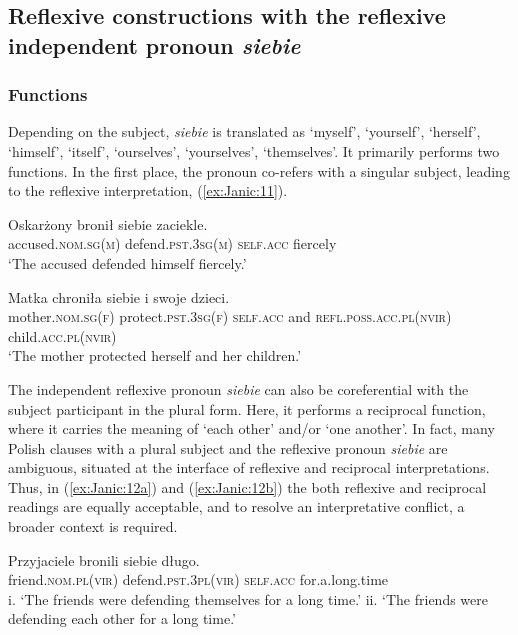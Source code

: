 \documentclass[output=paper]{langscibook}
\begin{document}
\subsection{Reflexive constructions with the reflexive independent pronoun \textit{siebie}} \label{sec:Janic:3.1}
\subsubsection{Functions} \label{sec:Janic:3.1.1}

Depending on the subject, \textit{siebie} is translated as ‘myself’, ‘yourself’, ‘herself’, ‘himself’, ‘itself’, ‘ourselves’, ‘yourselves’, ‘themselves’. It primarily performs two functions. In the first place, the pronoun co-refers with a singular subject, leading to the reflexive interpretation, (\ref{ex:Janic:11}).

\ea \label{ex:Janic:11}
\ea \label{ex:Janic:11a}
\gll Oskarżony	 	bronił			 siebie		 zaciekle.\\
		accused.\textsc{nom.sg(m)}	defend.\textsc{pst.3sg(m)}	\textsc{self.acc}	fiercely \\
\glt ‘The accused defended himself fiercely.’
	
\ex \label{ex:Janic:11b}
\gll Matka	 chroniła	 siebie 	 i 	swoje			 dzieci.\\
		mother.\textsc{nom.sg(f)}	protect.\textsc{pst.3sg(f)}	\textsc{self.acc}	and	\textsc{refl.poss.acc.pl(nvir)}	child.\textsc{acc.pl(nvir)} \\
\glt	‘The mother protected herself and her children.’
\z 
\z
	
	
The independent reflexive pronoun \textit{siebie} can also be coreferential with the subject participant in the plural form. Here, it performs a reciprocal function, where it carries the meaning of ‘each other’ and/or ‘one another’. In fact, many Polish clauses with a plural subject and the reflexive pronoun \textit{siebie} are ambiguous, situated at the interface of reflexive and reciprocal interpretations. Thus, in (\ref{ex:Janic:12a}) and (\ref{ex:Janic:12b}) the both reflexive and reciprocal readings are equally acceptable, and to resolve an interpretative conflict, a broader context is required.

\ea \label{ex:Janic:12}
\ea \label{ex:Janic:12a}
\gll Przyjaciele bronili  siebie 	długo.\\
		friend.\textsc{nom.pl(vir)} defend.\textsc{pst.3pl(vir)}	\textsc{self.acc}	for.a.long.time\\
\glt i. ‘The friends were defending themselves for a long time.’
\glt ii. ‘The friends were defending each other for a long time.’
\end{document}
